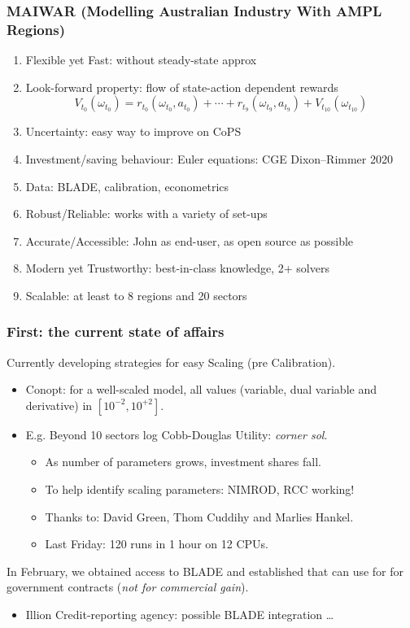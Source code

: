 \documentclass[handout,english]{beamer}
\begin{document}
\begin{frame}
  \frametitle{MAIWAR \small(Modelling Australian Industry With AMPL Regions)}
  \begin{enumerate}\footnotesize
    \item Flexible yet Fast: without steady-state approx
    \item Look-forward property: flow of state-action dependent rewards
  \[
    V_{t_0}(\omega_{t_0}) = r_{t_0}(\omega_{t_0}, a_{t_0}) + \cdots
    + r_{t_9}(\omega_{t_9}, a_{t_9}) + V_{t_{10}}(\omega_{t_{10}})
  \]
    \item Uncertainty: easy way to improve on CoPS
    \item Investment/saving behaviour: Euler equations: CGE Dixon--Rimmer 2020
    \item Data: BLADE, calibration, econometrics
    \item Robust/Reliable: works with a variety of set-ups
    \item Accurate/Accessible: John as end-user, as open source as possible
    \item Modern yet Trustworthy: best-in-class knowledge, 2+ solvers
    \item Scalable: at least to 8 regions and 20 sectors
  \end{enumerate}\normalsize
\end{frame}
\begin{frame}
  \frametitle{First: the current state of affairs}\thispagestyle{empty}
  Currently developing strategies for easy Scaling (pre Calibration).
    \begin{itemize}
      \item Conopt: for a well-scaled model, all values (variable,
        dual variable and derivative) in $[10^{-2} , 10^{+2}]$.
      \item E.g. Beyond 10 sectors log Cobb-Douglas Utility:
        \emph{corner sol}.
        \begin{itemize}
          \item As number of parameters grows, investment shares fall.
          \item To help identify scaling parameters: NIMROD, RCC working!
          \item Thanks to: David Green, Thom Cuddihy and Marlies Hankel.
          \item Last Friday: 120 runs in 1 hour on 12 CPUs.
        \end{itemize}
    \end{itemize}

  In February, we obtained access to BLADE and established that can use for
  for government contracts (\emph{not for commercial gain}).
  \begin{itemize}
    \item Illion Credit-reporting agency: possible BLADE integration \dots
  \end{itemize}
\end{frame}
\end{document}
